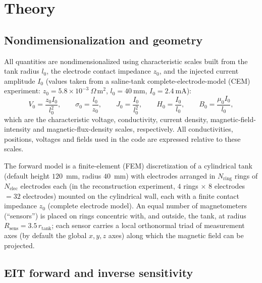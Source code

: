 \documentclass[11pt]{article}
\begin{document}
\section{Theory}

\subsection{Nondimensionalization and geometry}

All quantities are nondimensionalized using characteristic scales built from the tank radius $l_0$, the electrode contact impedance $z_0$, and the injected current amplitude $I_0$ (values taken from a saline-tank complete-electrode-model (CEM) experiment: $z_0 = 5.8\times10^{-3}\ \Omega\,\mathrm{m}^2$, $l_0 = 40\ \mathrm{mm}$, $I_0 = 2.4\ \mathrm{mA}$):
\begin{equation}
V_0 = \frac{z_0 I_0}{l_0^2}, \qquad
\sigma_0 = \frac{l_0}{z_0}, \qquad
J_0 = \frac{I_0}{l_0^2}, \qquad
H_0 = \frac{I_0}{l_0}, \qquad
B_0 = \frac{\mu_0 I_0}{l_0},
\end{equation}
which are the characteristic voltage, conductivity, current density, magnetic-field-intensity and magnetic-flux-density scales, respectively. All conductivities, positions, voltages and fields used in the code are expressed relative to these scales.

The forward model is a finite-element (FEM) discretization of a cylindrical tank (default height $120$~mm, radius $40$~mm) with electrodes arranged in $N_\text{ring}$ rings of $N_\text{elec}$ electrodes each (in the reconstruction experiment, $4$ rings $\times$ $8$ electrodes $=32$ electrodes) mounted on the cylindrical wall, each with a finite contact impedance $z_0$ (complete electrode model). An equal number of magnetometers (``sensors'') is placed on rings concentric with, and outside, the tank, at radius $R_\text{sens} = 3.5\,r_\text{tank}$; each sensor carries a local orthonormal triad of measurement axes (by default the global $x,y,z$ axes) along which the magnetic field can be projected.

\subsection{EIT forward and inverse sensitivity}
\end{document}

